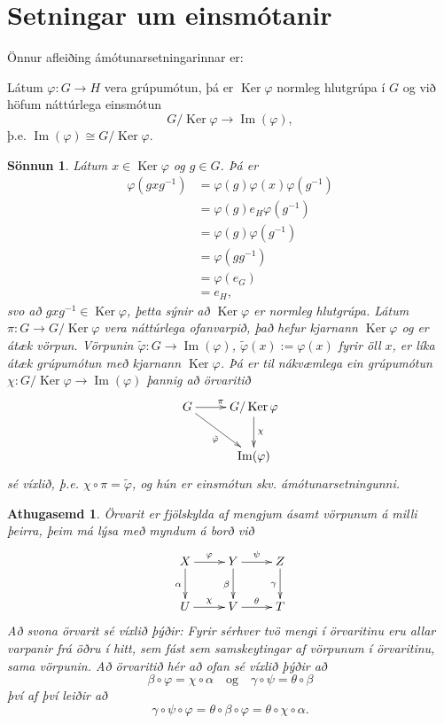 \documentclass[a4paper,icelandic,11pt]{book}
\theoremstyle{plain}
\newtheorem*{ath}{Athugasemd}
\newtheorem*{sonnun}{Sönnun}
\DeclareMathOperator{\im}{Im} %
\DeclareMathOperator{\Ker}{Ker} %
\begin{document}
\section{Setningar um einsmótanir}
Önnur afleiðing ámótunarsetningarinnar er:
\begin{setn}
  Látum $\varphi:G\to H$ vera grúpumótun, þá er $\Ker\varphi$ normleg hlutgrúpa
  í $G$ og við höfum náttúrlega einsmótun\footnotemark
  \begin{equation*}
    G/\Ker\varphi\to \im(\varphi),
  \end{equation*}
  þ.e. $\im(\varphi) \cong G/\Ker\varphi$.
\end{setn}
\begin{sonnun}
  Látum $x\in \Ker\varphi$ og $g\in G$. Þá er
  \begin{align*}
    \varphi(gxg^{-1})
    &= \varphi(g)\varphi(x)\varphi(g^{-1}) \\
    &= \varphi(g)e_H\varphi(g^{-1}) \\
    &= \varphi(g)\varphi(g^{-1}) \\
    &= \varphi(gg^{-1}) \\
    &= \varphi(e_G) \\
    &= e_H,
  \end{align*}
  svo að $gxg^{-1}\in \Ker\varphi$, þetta sýnir að $\Ker\varphi$ er normleg
  hlutgrúpa. Látum $\pi:G\to G/\Ker\varphi$ vera náttúrlega ofanvarpið, það
  hefur kjarnann $\Ker\varphi$ og er átæk vörpun. Vörpunin
  $\tilde{\varphi}:G\to\im(\varphi)$, $\tilde{\varphi}(x):=\varphi(x)$ fyrir öll
  $x$, er líka átæk grúpumótun með kjarnann $\Ker\varphi$. Þá er til nákvæmlega
  ein grúpumótun $\chi:G/\Ker\varphi\to \im(\varphi)$ þannig að örvaritið
  \[
  \xymatrix{
  G \ar[r]^{\pi} \ar[dr]_{\tilde{\varphi}} & G/\Ker\varphi\ar[d]^{\chi} \\
  & \im(\varphi)
  }
  \]
  sé víxlið, þ.e. $\chi\circ\pi = \tilde{\varphi}$, og hún er einsmótun skv.
  ámótunarsetningunni.
\end{sonnun}
\begin{ath}
  \emph{Örvarit} er fjölskylda af mengjum ásamt vörpunum á milli þeirra, þeim má
  lýsa með myndum á borð við
  \[
  \xymatrix{
  X \ar[r]^{\varphi} \ar[d]_\alpha 
  & Y \ar[r]^\psi \ar[d]_\beta
  & Z\ar[d]_\gamma
  \\
  U \ar[r]^{\chi}
  & V \ar[r]^\theta
  & T
  }
  \]
  Að svona örvarit sé \emph{víxlið} þýðir: Fyrir sérhver tvö mengi í örvaritinu
  eru allar varpanir frá öðru í hitt, sem fást sem samskeytingar af vörpunum í
  örvaritinu, sama vörpunin.
  Að örvaritið hér að ofan sé víxlið þýðir að 
  \begin{equation*}
    \beta\circ\varphi = \chi\circ\alpha
    \quad\text{og}\quad
    \gamma\circ\psi = \theta\circ\beta
  \end{equation*}
  því af því leiðir að 
  \begin{equation*}
      \gamma \circ \psi  \circ \varphi
    = \theta \circ \beta \circ \varphi
    = \theta \circ \chi  \circ \alpha.
  \end{equation*}
\end{ath}
\end{document}

